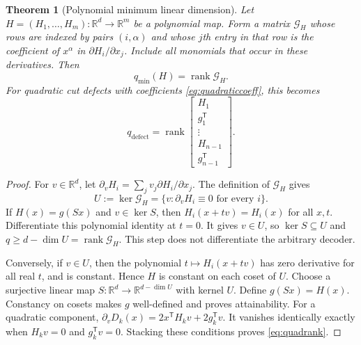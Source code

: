 \documentclass[11pt,a4paper]{article}
\newtheorem{theorem}{Theorem}\newtheorem{proposition}[theorem]{Proposition}\newtheorem{lemma}[theorem]{Lemma}\newtheorem{corollary}[theorem]{Corollary}
\theoremstyle{definition}\newtheorem{definition}[theorem]{Definition}\newtheorem{example}[theorem]{Example}\newtheorem{remark}[theorem]{Remark}
\DeclareMathOperator{\rank}{rank}\DeclareMathOperator{\im}{im}\DeclareMathOperator{\spanop}{span}\DeclareMathOperator{\diag}{diag}
\newcommand{\R}{\mathbb R}\newcommand{\Q}{\mathbb Q}\newcommand{\Z}{\mathbb Z}\newcommand{\N}{\mathbb N}\newcommand{\id}{\mathrm{id}}
\begin{document}
\begin{theorem}[Polynomial minimum linear dimension]\label{thm:polynomial}
Let $H=(H_1,\ldots,H_m):\R^d\to\R^m$ be a polynomial map.
Form a matrix $\mathcal G_H$ whose rows are indexed by pairs
$(i,\alpha)$ and whose $j$th entry in that row is the coefficient
of $x^\alpha$ in $\partial H_i/\partial x_j$. Include all monomials
that occur in these derivatives. Then
\begin{equation}\label{eq:polyrank}
 \boxed{q_{\min}(H)=\rank\mathcal G_H.}
\end{equation}
For quadratic cut defects with coefficients \eqref{eq:quadraticcoeff},
this becomes
\begin{equation}\label{eq:quadrank}
 q_{\mathrm{defect}}=
 \rank\begin{bmatrix}H_1\\g_1^{\mathsf T}\\\vdots\\H_{n-1}\\g_{n-1}^{\mathsf T}\end{bmatrix}.
\end{equation}
\end{theorem}
\begin{proof}
For $v\in\R^d$, let $\partial_v H_i=\sum_jv_j\partial H_i/\partial x_j$.
The definition of $\mathcal G_H$ gives
\[
 U:=\ker\mathcal G_H
   =\{v:\partial_vH_i\equiv0\text{ for every }i\}.
\]
If $H(x)=g(Sx)$ and $v\in\ker S$, then
$H_i(x+tv)=H_i(x)$ for all $x,t$. Differentiate this polynomial
identity at $t=0$. It gives $v\in U$, so
$\ker S\subseteq U$ and $q\ge d-\dim U=\rank\mathcal G_H$.
This step does not differentiate the arbitrary decoder.

Conversely, if $v\in U$, then the polynomial
$t\mapsto H_i(x+tv)$ has zero derivative for all real $t$, and is
constant. Hence $H$ is constant on each coset of $U$. Choose a
surjective linear map $S:\R^d\to\R^{d-\dim U}$ with kernel $U$.
Define $g(Sx)=H(x)$. Constancy on cosets makes $g$ well-defined and
proves attainability. For a quadratic component,
$\partial_vD_k(x)=2x^{\mathsf T}H_kv+2g_k^{\mathsf T}v$.
It vanishes identically exactly when $H_kv=0$ and
$g_k^{\mathsf T}v=0$. Stacking these conditions proves
\eqref{eq:quadrank}.
\end{proof}
\end{document}
